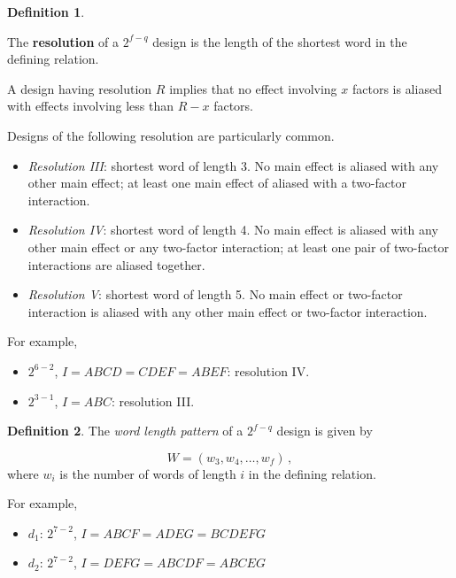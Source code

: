 \documentclass[
]{book}
\theoremstyle{definition}
\newtheorem{definition}{Definition}[chapter]
\theoremstyle{definition}
\theoremstyle{definition}
\theoremstyle{definition}
\theoremstyle{remark}
\begin{document}
\begin{definition}
\protect\hypertarget{def:resolution}{}\label{def:resolution}

The \textbf{resolution} of a \(2^{f-q}\) design is the length of the shortest word in the defining relation.

A design having resolution \(R\) implies that no effect involving \(x\) factors is aliased with effects involving less than \(R-x\) factors.

Designs of the following resolution are particularly common.

\begin{itemize}
\item
  \emph{Resolution III}: shortest word of length 3. No main effect is aliased with any other main effect; at least one main effect of aliased with a two-factor interaction.
\item
  \emph{Resolution IV}: shortest word of length 4. No main effect is aliased with any other main effect or any two-factor interaction; at least one pair of two-factor interactions are aliased together.
\item
  \emph{Resolution V}: shortest word of length 5. No main effect or two-factor interaction is aliased with any other main effect or two-factor interaction.
\end{itemize}

\end{definition}

For example,

\begin{itemize}
\item
  \(2^{6-2}\), \(I = ABCD = CDEF = ABEF\): resolution IV.
\item
  \(2^{3-1}\), \(I = ABC\): resolution III.
\end{itemize}

\begin{definition}
\protect\hypertarget{def:wlp}{}\label{def:wlp}The \emph{word length pattern} of a \(2^{f-q}\) design is given by

\[
W = (w_3, w_4, \ldots, w_f)\,,
\]
where \(w_i\) is the number of words of length \(i\) in the defining relation.
\end{definition}

For example,

\begin{itemize}
\item
  \(d_1\): \(2^{7-2}\), \(I = ABCF = ADEG = BCDEFG\)
\item
  \(d_2\): \(2^{7-2}\), \(I = DEFG = ABCDF = ABCEG\)
\end{itemize}
\end{document}
